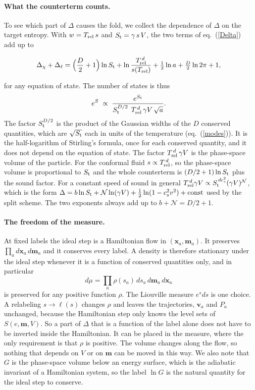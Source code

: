 \documentclass[11pt,aps,preprint,nofootinbib,superscriptaddress,tightenlines]{revtex4-2}
\def\st{\begin{equation}}
\def\stp{\end{equation}}
\def\Eq#1{eq.~(\ref{#1})}
\let\oldparagraph\paragraph
\renewcommand{\paragraph}{\par\bigskip\oldparagraph}
\begin{document}
\paragraph{What the counterterm counts.}  To see which part of $\Delta$ causes the fold, we collect the dependence of $\Delta$ on the target entropy.
With $w=T_{\rm rel}\,s$ and $S_{\rm t}=\gamma\,s\,V$, the two terms of \Eq{Delta} add up to
\begin{keyeq}
\st
\Delta_\chi+\Delta_\ell=\Big(\frac D2+1\Big)\ln S_{\rm t}+\ln\frac{T_{\rm rel}^{\,d}}{s(T_{\rm rel})}+\tfrac12\ln a+\tfrac D2\ln2\pi+1 ,
\label{Deltasplit}
\stp
\end{keyeq}
for any equation of state.  The number of states is thus
\st
e^{S}\;\propto\;\frac{e^{S_{\rm t}}}{S_{\rm t}^{D/2}\;\,T_{\rm rel}^{\,d}\,\gamma V\,\sqrt a} .
\stp
The factor $S_{\rm t}^{D/2}$ is the product of the Gaussian widths of the $D$ conserved quantities, which are $\sqrt{S_{\rm t}}$ each in units of the
temperature (\Eq{modes}).  It is the half-logarithm of Stirling's formula, once for each conserved quantity, and it does not depend on the equation
of state.  The factor $T_{\rm rel}^{\,d}\,\gamma V$ is the phase-space volume of the particle.  For the conformal fluid $s\propto T_{\rm rel}^{\,d}$, so
the phase-space volume is proportional to $S_{\rm t}$ and the whole counterterm is $(D/2+1)\ln S_{\rm t}$ plus the sound factor.  For a constant
speed of sound in general $T_{\rm rel}^{\,d}\gamma V\propto S_{\rm t}^{\,dc_s^2}(\gamma V)^{\mathcal N}$, which is the form
$\Delta=b\ln S_{\rm t}+\mathcal N\ln(\gamma V)+\tfrac12\ln(1-c_s^2v^2)+\text{const}$ used by the split scheme.  The two exponents always add up to
$b+\mathcal N=D/2+1$.

\paragraph{The freedom of the measure.}  At fixed labels the ideal step is a Hamiltonian flow in $(\bm x_a,\bm m_a)$.  It preserves
$\prod_ad\bm x_a\,d\bm m_a$ and it conserves every label.  A density is therefore stationary under the ideal step whenever it is a function of
conserved quantities only, and in particular
\st
d\mu=\prod_a\rho(s_a)\,ds_a\,d\bm m_a\,d\bm x_a
\stp
is preserved for any positive function $\rho$.  The Liouville measure $e^{s}ds$ is one choice.  A relabeling $s\to\ell(s)$ changes $\rho$ and leaves
the trajectories, $\bm v_a$ and $P_a$ unchanged, because the Hamiltonian step only knows the level sets of $S(e,\bm m,V)$.  So a part of $\Delta$ that
is a function of the label alone does not have to be inverted inside the Hamiltonian.  It can be placed in the measure, where the only requirement is
that $\rho$ is positive.  The volume changes along the flow, so nothing that depends on $V$ or on $\bm m$ can be moved in this way.  We also note
that $G$ is the phase-space volume below an energy surface, which is the adiabatic invariant of a Hamiltonian system, so the label $\ln G$ is the
natural quantity for the ideal step to conserve.
\end{document}
